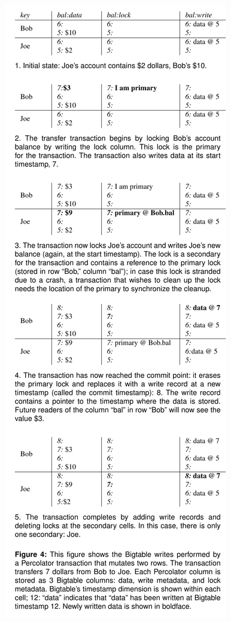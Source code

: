 \documentclass[11pt]{article}
\begin{document}
\begin{center}
\includegraphics[height=\textheight]{../../images/papers/6.png}
\label{}
\end{center}
\end{document}
